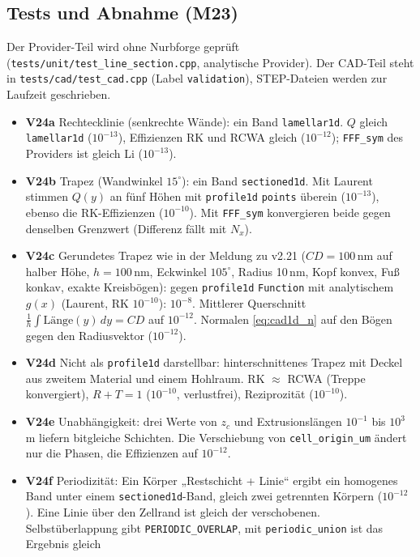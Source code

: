 \subsection{Tests und Abnahme (M23)}
Der Provider-Teil wird ohne Nurbforge geprüft (\verb|tests/unit/test_line_section.cpp|, analytische Provider). Der
CAD-Teil steht in \verb|tests/cad/test_cad.cpp| (Label \verb|validation|), STEP-Dateien werden zur Laufzeit geschrieben.
\begin{itemize}[nosep]
  \item \textbf{V24a} Rechtecklinie (senkrechte Wände): ein Band \verb|lamellar1d|. $Q$ gleich \verb|lamellar1d|
        ($10^{-13}$), Effizienzen RK und RCWA gleich ($10^{-12}$); \verb|FFF_sym| des Providers ist gleich Li ($10^{-13}$).
  \item \textbf{V24b} Trapez (Wandwinkel $15^\circ$): ein Band \verb|sectioned1d|. Mit Laurent stimmen $Q(y)$ an fünf
        Höhen mit \verb|profile1d| \verb|points| überein ($10^{-13}$), ebenso die RK-Effizienzen ($10^{-10}$). Mit
        \verb|FFF_sym| konvergieren beide gegen denselben Grenzwert (Differenz fällt mit $N_x$).
  \item \textbf{V24c} Gerundetes Trapez wie in der Meldung zu v2.21 ($CD=100$\,nm auf halber Höhe, $h=100$\,nm,
        Eckwinkel $105^\circ$, Radius 10\,nm, Kopf konvex, Fuß konkav, exakte Kreisbögen): gegen \verb|profile1d|
        \verb|Function| mit analytischem $g(x)$ (Laurent, RK $10^{-10}$): $10^{-8}$. Mittlerer Querschnitt
        $\frac1h\int\!\text{Länge}(y)\,dy=CD$ auf $10^{-12}$. Normalen \eqref{eq:cad1d_n} auf den Bögen gegen den
        Radiusvektor ($10^{-12}$).
  \item \textbf{V24d} Nicht als \verb|profile1d| darstellbar: hinterschnittenes Trapez mit Deckel aus zweitem Material
        und einem Hohlraum. RK $\approx$ RCWA (Treppe konvergiert), $R+T=1$ ($10^{-10}$, verlustfrei), Reziprozität
        ($10^{-10}$).
  \item \textbf{V24e} Unabhängigkeit: drei Werte von $z_c$ und Extrusionslängen $10^{-1}$ bis $10^{3}$\,\textmu m liefern
        bitgleiche Schichten. Die Verschiebung von \verb|cell_origin_um| ändert nur die Phasen, die Effizienzen auf $10^{-12}$.
  \item \textbf{V24f} Periodizität: Ein Körper „Restschicht + Linie“ ergibt ein homogenes Band unter einem
        \verb|sectioned1d|-Band, gleich zwei getrennten Körpern ($10^{-12}$). Eine Linie über den Zellrand ist gleich der
        verschobenen. Selbstüberlappung gibt \verb|PERIODIC_OVERLAP|, mit \verb|periodic_union| ist das Ergebnis gleich

\end{itemize}
